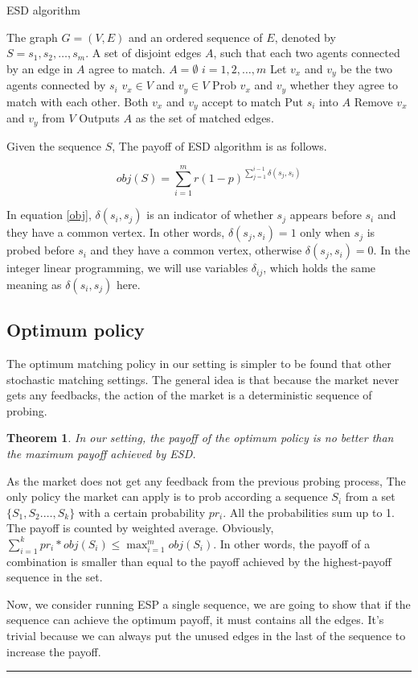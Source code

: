 \documentclass[letterpaper]{article}
\newtheorem{theorem}{Theorem}%
\newenvironment{proof}{{Proof:}}{\hfill\rule{2mm}{2mm}}
\begin{document}
\begin{algorithm}
	\caption{ESD algorithm}
	\label{alg:esd}
	\begin{algorithmic}[1]
		\Require
		The graph $G=(V,E)$ and an ordered sequence of $E$, denoted by $S=s_1,s_2,\ldots,s_m$.
		\Ensure A set of disjoint edges $A$, such that each two agents connected by an edge in $A$ agree to match. 
		\State $A=\emptyset$
		\For $i=1,2,\ldots,m$
		\State Let $v_x$ and $v_y$ be the two agents connected by $s_i$
		\If $v_x\in V$ and $v_y\in V$
		\State Prob $v_x$ and $v_y$ whether they agree to match with each other.
		\If Both $v_x$ and $v_y$ accept to match
		\State Put $s_i$ into $A$
		\State Remove $v_x$ and $v_y$ from $V$
		\EndIf
		\EndIf
		\EndFor
		\State Outputs $A$ as the set of matched edges.
	\end{algorithmic}
\end{algorithm}

Given the sequence $S$, The payoff of ESD algorithm is as follows.

\begin{equation}\label{obj}
obj(S)=\sum_{i=1}^m r(1-p)^{\sum_{j=1}^{i-1}\delta(s_j,s_i)}
\end{equation}

In equation \ref{obj}, $\delta(s_i,s_j)$ is an indicator of whether $s_j$ appears before $s_i$ and they have a common vertex. In other words, $\delta(s_j,s_i)=1$ only when $s_j$ is probed before $s_i$ and they have a common vertex, otherwise  $\delta(s_j,s_i)=0$. 
In the integer linear programming, we will use variables $\delta_{ij}$, which holds the same meaning as $\delta(s_i,s_j)$ here.

\subsection{Optimum policy}

The optimum matching policy in our setting is simpler to be found that other stochastic matching settings.
The general idea is that because the market never gets any feedbacks, the action of the market is a deterministic sequence of probing.
\begin{theorem}
	In our setting, the payoff of the optimum policy is no better than the maximum payoff achieved by ESD.
\end{theorem}
\begin{proof}
	As the market does not get any feedback from the previous probing process,
	The only policy the market can apply is to prob according a sequence $S_i$ from a set $\{S_1,S_2.\ldots,S_k\}$ with a certain probability $pr_i$.
	All the probabilities sum up to 1.
	The payoff is counted by weighted average.
	Obviously, $\sum_{i=1}^{k}pr_i*obj(S_i)\leq \max_{i=1}^{m}obj(S_i)$.
	In other words, the payoff of a combination is smaller than equal to the payoff achieved by the highest-payoff sequence in the set.
	
	Now, we consider running ESP a single sequence, we are going to show that if the sequence can achieve the optimum payoff, it must contains all the edges. It's trivial because we can always put the unused edges in the last of the sequence to increase the payoff. 
\end{proof}
\end{document}
